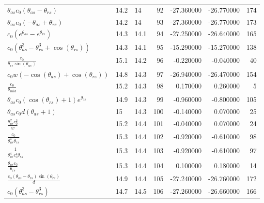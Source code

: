 \begin{tabularx}{\textwidth}{lllrrrr}
$ \theta_{as} c_{0} \left(\theta_{as} - \theta_{rs}\right) $  &  14.2  &  14\phantom{.0}  &  92  &  -27.360000  &  -26.770000  &  174  \\ 
$ \theta_{as} c_{0} \left(- \theta_{as} + \theta_{rs}\right) $  &  14.2  &  14\phantom{.0}  &  93  &  -27.360000  &  -26.770000  &  173  \\ 
$ c_{0} \left(e^{\theta_{as}} - e^{\theta_{rs}}\right) $  &  14.3  &  14.1  &  94  &  -27.250000  &  -26.640000  &  165  \\ 
$ c_{0} \left(\theta_{as}^{3} - \theta_{rs}^{3} + \cos{\left(\theta_{rs} \right)}\right) $  &  14.3  &  14.1  &  95  &  -15.290000  &  -15.270000  &  138  \\ 
$ \displaystyle\frac{c_{0}}{\theta_{rs} \sin{\left(\theta_{as} \right)}} $  &  15.1  &  14.2  &  96  &  -0.220000  &  -0.040000  &  40  \\ 
$ c_{0} w \left(- \cos{\left(\theta_{as} \right)} + \cos{\left(\theta_{rs} \right)}\right) $  &  14.8  &  14.3  &  97  &  -26.940000  &  -26.470000  &  154  \\ 
$ \displaystyle\frac{c_{0}}{\theta_{mid}} $  &  15.2  &  14.3  &  98  &  0.170000  &  0.260000  &  5  \\ 
$ \theta_{as} c_{0} \left(\cos{\left(\theta_{rs} \right)} + 1\right) e^{\theta_{as}} $  &  14.9  &  14.3  &  99  &  -0.960000  &  -0.800000  &  105  \\ 
$ \theta_{as} c_{0} d \left(\theta_{as} + 1\right) $  &  15\phantom{.0}  &  14.3  &  100  &  -0.140000  &  0.070000  &  25  \\ 
$ \displaystyle\frac{\theta_{as}^{2} c_{0}^{2}}{w} $  &  15.2  &  14.4  &  101  &  -0.040000  &  0.070000  &  24  \\ 
$ \displaystyle\frac{c_{0}}{\theta_{as}^{4} \theta_{rs}} $  &  15.3  &  14.4  &  102  &  -0.920000  &  -0.610000  &  98  \\ 
$ \displaystyle\frac{1}{\theta_{as}^{4} c_{0}^{4} \theta_{rs}} $  &  15.3  &  14.4  &  103  &  -0.920000  &  -0.610000  &  97  \\ 
$ \displaystyle\frac{\theta_{as} c_{0}}{\theta_{rs}} $  &  15.3  &  14.4  &  104  &  0.100000  &  0.180000  &  14  \\ 
$ \displaystyle\frac{c_{0} \left(\theta_{as} - \theta_{rs}\right) \sin{\left(\theta_{rs} \right)}}{d} $  &  14.9  &  14.4  &  105  &  -27.240000  &  -26.760000  &  172  \\ 
$ c_{0} \left(\theta_{as}^{3} - \theta_{rs}^{3}\right) $  &  14.7  &  14.5  &  106  &  -27.260000  &  -26.660000  &  166  \\ 

\end{tabularx}
